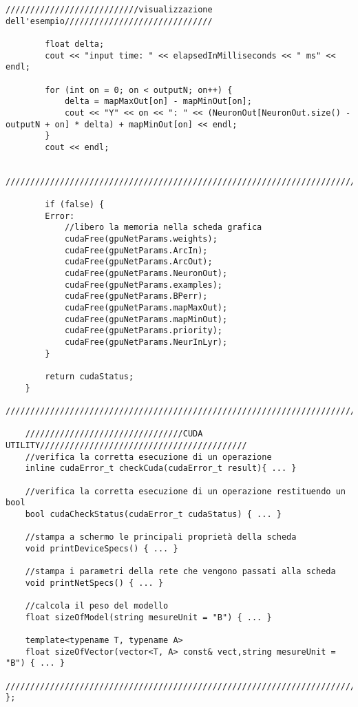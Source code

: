 \documentclass[10pt,a4paper]{article}
\begin{document}
\begin{lstlisting}[style=mycuda, caption= classe di interfaccia alla GPU, captionpos=b]
		///////////////////////////visualizzazione dell'esempio//////////////////////////////

		float delta;
		cout << "input time: " << elapsedInMilliseconds << " ms" << endl;

		for (int on = 0; on < outputN; on++) {
			delta = mapMaxOut[on] - mapMinOut[on];
			cout << "Y" << on << ": " << (NeuronOut[NeuronOut.size() - outputN + on] * delta) + mapMinOut[on] << endl;
		}
		cout << endl;
		
		//////////////////////////////////////////////////////////////////////////////////////

		if (false) {
		Error:
			//libero la memoria nella scheda grafica
			cudaFree(gpuNetParams.weights);
			cudaFree(gpuNetParams.ArcIn);
			cudaFree(gpuNetParams.ArcOut);
			cudaFree(gpuNetParams.NeuronOut);
			cudaFree(gpuNetParams.examples);
			cudaFree(gpuNetParams.BPerr);
			cudaFree(gpuNetParams.mapMaxOut);
			cudaFree(gpuNetParams.mapMinOut);
			cudaFree(gpuNetParams.priority);
			cudaFree(gpuNetParams.NeurInLyr);
		}

		return cudaStatus;
	}
	//////////////////////////////////////////////////////////////////////////////////////
	
	////////////////////////////////CUDA UTILITY//////////////////////////////////////////
	//verifica la corretta esecuzione di un operazione
	inline cudaError_t checkCuda(cudaError_t result){ ... }
	
	//verifica la corretta esecuzione di un operazione restituendo un bool
	bool cudaCheckStatus(cudaError_t cudaStatus) { ... }
	
	//stampa a schermo le principali proprietà della scheda
	void printDeviceSpecs() { ... }
	
	//stampa i parametri della rete che vengono passati alla scheda
	void printNetSpecs() { ... }
	
	//calcola il peso del modello
	float sizeOfModel(string mesureUnit = "B") { ... }
	
	template<typename T, typename A>
	float sizeOfVector(vector<T, A> const& vect,string mesureUnit = "B") { ... }
	//////////////////////////////////////////////////////////////////////////////////////
};

\end{lstlisting}
\end{document}
